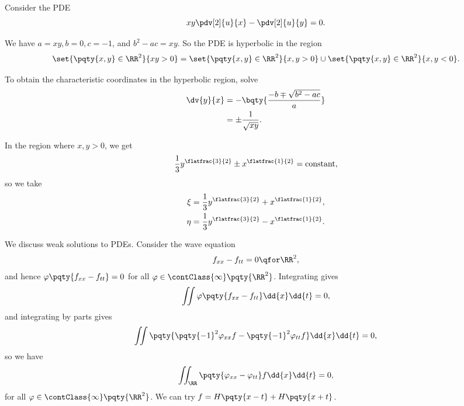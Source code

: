 \begin{example}
    Consider the PDE
    \begin{equation}
        xy \pdv[2]{u}{x} - \pdv[2]{u}{y} = 0.
    \end{equation}

    We have \(a = xy, b = 0, c = -1\), and \(b^2 - ac = xy\). So the PDE is hyperbolic in the region
    \begin{equation}
        \set{\pqty{x, y} \in \RR^2}{xy > 0} = \set{\pqty{x, y} \in \RR^2}{x, y > 0} \cup \set{\pqty{x, y} \in \RR^2}{x, y < 0}.
    \end{equation}
    
    To obtain the characteristic coordinates in the hyperbolic region, solve
    \begin{subequations}
        \begin{align}
            \dv{y}{x} &= - \bqty{\frac{-b \mp \sqrt{b^2 - ac}}{a}} \\
            &= \pm \frac{1}{\sqrt{xy}}.
        \end{align}
    \end{subequations}
    
    In the region where \(x, y > 0\), we get
    \begin{equation}
        \frac{1}{3} y^{\flatfrac{3}{2}} \pm x^{\flatfrac{1}{2}} = \text{constant},
    \end{equation}
    so we take
    \begin{subequations}
        \begin{align}
            \xi &= \frac{1}{3} y^{\flatfrac{3}{2}} + x^{\flatfrac{1}{2}}, \\
            \eta &= \frac{1}{3} y^{\flatfrac{3}{2}} - x^{\flatfrac{1}{2}}.
        \end{align}
    \end{subequations}
\end{example}

\small

We discuss weak solutions to PDEs. Consider the wave equation
\begin{equation}
    f_{xx} - f_{tt} = 0 \qfor \RR^2,
\end{equation}
and hence \(\varphi\pqty{f_{xx} - f_{tt}} = 0\) for all \(\varphi \in \contClass{\infty} \pqty{\RR^2}\). Integrating gives
\begin{equation}
    \iint \varphi\pqty{f_{xx} - f_{tt}} \dd{x} \dd{t} = 0,
\end{equation}
and integrating by parts gives
\begin{equation}
    \iint \pqty{\pqty{-1}^2 \varphi_{xx} f - \pqty{-1}^2 \varphi_{tt} f} \dd{x} \dd{t} = 0,
\end{equation}
so we have
\begin{equation}
    \iint_{\RR} \pqty{\varphi_{xx} - \varphi_{tt}} f \dd{x} \dd{t} = 0,
\end{equation}
for all \(\varphi \in \contClass{\infty} \pqty{\RR^2}\). We can try \(f = H\pqty{x - t} + H\pqty{x + t}\).

